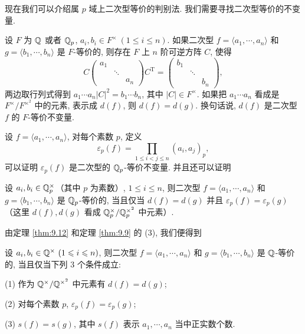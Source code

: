 现在我们可以介绍属 $p$ 域上二次型等价的判别法. 我们需要寻找二次型等价的不变量.

设 $F$ 为 $\mathbb{Q}$ 或者 $\mathbb{Q}_p$, $a_i,b_i\in F^{\times}\ (1\leqslant i\leqslant n)$. 如果二次型 $f=\langle a_1,\cdots,a_n\rangle$ 和 $g=\langle b_1,\cdots,b_n\rangle$ 是 $F$-等价的, 则存在 $F$ 上 $n$ 阶可逆方阵 $C$, 使得
\[
  C\left(\begin{array}{ccc}a_1& &\\ & \ddots &\\ & & a_n\end{array}\right)
  C^{\mathrm{T}}
  =\left(\begin{array}{ccc}b_1& &\\ & \ddots &\\ & & b_n\end{array}\right),
\]
两边取行列式得到 $a_1\cdots a_n|C|^2=b_1\cdots b_n$, 其中 $|C|\in F^{\times}$. 如果把 $a_1\cdots a_n$ 看成是 $F^{\times}/F^{\times^2}$ 中的元素, 表示成 $d(f)$, 则 $d(f)=d(g)$. 换句话说, $d(f)$ 是二次型 $f$ 的 $F$-等价不变量.

设 $f=\langle a_1,\cdots,a_n\rangle$, 对每个素数 $p$, 定义
\[
  \varepsilon_p(f)=\prod_{1\leqslant i<j\leqslant n}(a_i,a_j)_p,
\]
可以证明 $\varepsilon_p(f)$ 是二次型的 $\mathbb{Q}_p$-等价不变量. 并且还可以证明

\begin{theorem}\label{thm:9.12}
设 $a_i,b_i\in\mathbb{Q}_p^{\times}$（其中 $p$ 为素数）, $1\leqslant i\leqslant n$, 则二次型 $f=\langle a_1,\cdots,a_n\rangle$ 和 $g=\langle b_1,\cdots,b_n\rangle$ 是 $\mathbb{Q}_p$-等价的, 当且仅当 $d(f)=d(g)$ 并且 $\varepsilon_p(f)=\varepsilon_p(g)$（这里 $d(f),d(g)$ 看成 $\mathbb{Q}_p^{\times}/\mathbb{Q}_p^{\times^2}$ 中元素）.
\end{theorem}

由定理 \ref{thm:9.12} 和定理 \ref{thm:9.9} 的 (3), 我们便得到

\begin{theorem}\label{thm:9.13}
设 $a_i,b_i\in\mathbb{Q}^{\times}\ (1\leqslant i\leqslant n)$, 则二次型 $f=\langle a_1,\cdots,a_n\rangle$ 和 $g=\langle b_1,\cdots,b_n\rangle$ 是 $\mathbb{Q}$-等价的, 当且仅当下列 $3$ 个条件成立:

(1) 作为 $\mathbb{Q}^{\times}/\mathbb{Q}^{\times^2}$ 中元素有 $d(f)=d(g)$;

(2) 对每个素数 $p$, $\varepsilon_p(f)=\varepsilon_p(g)$;

(3) $s(f)=s(g)$, 其中 $s(f)$ 表示 $a_1,\cdots,a_n$ 当中正实数个数.
\end{theorem}

